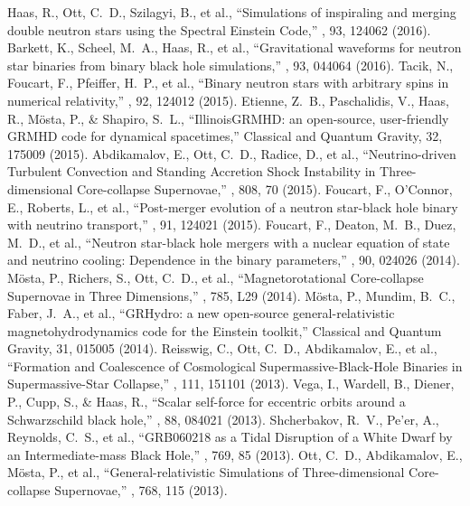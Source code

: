  Haas, R., Ott, C.~D., Szilagyi, B., et al., ``Simulations of inspiraling and merging double neutron stars using the Spectral Einstein Code,'' \prd, 93, 124062 (2016).
 Barkett, K., Scheel, M.~A., Haas, R., et al., ``Gravitational waveforms for neutron star binaries from binary black hole simulations,'' \prd, 93, 044064 (2016).
 Tacik, N., Foucart, F., Pfeiffer, H.~P., et al., ``Binary neutron stars with arbitrary spins in numerical relativity,'' \prd, 92, 124012 (2015).
 Etienne, Z.~B., Paschalidis, V., Haas, R., M{\"o}sta, P., \& Shapiro, S.~L., ``IllinoisGRMHD: an open-source, user-friendly GRMHD code for dynamical spacetimes,'' Classical and Quantum Gravity, 32, 175009 (2015).
 Abdikamalov, E., Ott, C.~D., Radice, D., et al., ``Neutrino-driven Turbulent Convection and Standing Accretion Shock Instability in Three-dimensional Core-collapse Supernovae,'' \apj, 808, 70 (2015).
 Foucart, F., O'Connor, E., Roberts, L., et al., ``Post-merger evolution of a neutron star-black hole binary with neutrino transport,'' \prd, 91, 124021 (2015).
 Foucart, F., Deaton, M.~B., Duez, M.~D., et al., ``Neutron star-black hole mergers with a nuclear equation of state and neutrino cooling: Dependence in the binary parameters,'' \prd, 90, 024026 (2014).
 M{\"o}sta, P., Richers, S., Ott, C.~D., et al., ``Magnetorotational Core-collapse Supernovae in Three Dimensions,'' \apjl, 785, L29 (2014).
 M{\"o}sta, P., Mundim, B.~C., Faber, J.~A., et al., ``GRHydro: a new open-source general-relativistic magnetohydrodynamics code for the Einstein toolkit,'' Classical and Quantum Gravity, 31, 015005 (2014).
 Reisswig, C., Ott, C.~D., Abdikamalov, E., et al., ``Formation and Coalescence of Cosmological Supermassive-Black-Hole Binaries in Supermassive-Star Collapse,'' \prl, 111, 151101 (2013).
 Vega, I., Wardell, B., Diener, P., Cupp, S., \& Haas, R., ``Scalar self-force for eccentric orbits around a Schwarzschild black hole,'' \prd, 88, 084021 (2013).
 Shcherbakov, R.~V., Pe'er, A., Reynolds, C.~S., et al., ``GRB060218 as a Tidal Disruption of a White Dwarf by an Intermediate-mass Black Hole,'' \apj, 769, 85 (2013).
 Ott, C.~D., Abdikamalov, E., M{\"o}sta, P., et al., ``General-relativistic Simulations of Three-dimensional Core-collapse Supernovae,'' \apj, 768, 115 (2013).

